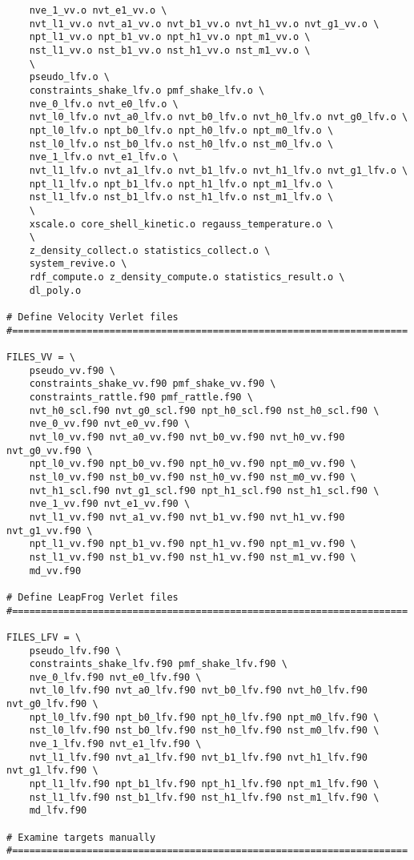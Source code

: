\begin{verbatim}
	nve_1_vv.o nvt_e1_vv.o \
	nvt_l1_vv.o nvt_a1_vv.o nvt_b1_vv.o nvt_h1_vv.o nvt_g1_vv.o \
	npt_l1_vv.o npt_b1_vv.o npt_h1_vv.o npt_m1_vv.o \
	nst_l1_vv.o nst_b1_vv.o nst_h1_vv.o nst_m1_vv.o \
	\
	pseudo_lfv.o \
	constraints_shake_lfv.o pmf_shake_lfv.o \
	nve_0_lfv.o nvt_e0_lfv.o \
	nvt_l0_lfv.o nvt_a0_lfv.o nvt_b0_lfv.o nvt_h0_lfv.o nvt_g0_lfv.o \
	npt_l0_lfv.o npt_b0_lfv.o npt_h0_lfv.o npt_m0_lfv.o \
	nst_l0_lfv.o nst_b0_lfv.o nst_h0_lfv.o nst_m0_lfv.o \
	nve_1_lfv.o nvt_e1_lfv.o \
	nvt_l1_lfv.o nvt_a1_lfv.o nvt_b1_lfv.o nvt_h1_lfv.o nvt_g1_lfv.o \
	npt_l1_lfv.o npt_b1_lfv.o npt_h1_lfv.o npt_m1_lfv.o \
	nst_l1_lfv.o nst_b1_lfv.o nst_h1_lfv.o nst_m1_lfv.o \
	\
	xscale.o core_shell_kinetic.o regauss_temperature.o \
	\
	z_density_collect.o statistics_collect.o \
	system_revive.o \
	rdf_compute.o z_density_compute.o statistics_result.o \
	dl_poly.o

# Define Velocity Verlet files
#=====================================================================

FILES_VV = \
	pseudo_vv.f90 \
	constraints_shake_vv.f90 pmf_shake_vv.f90 \
	constraints_rattle.f90 pmf_rattle.f90 \
	nvt_h0_scl.f90 nvt_g0_scl.f90 npt_h0_scl.f90 nst_h0_scl.f90 \
	nve_0_vv.f90 nvt_e0_vv.f90 \
	nvt_l0_vv.f90 nvt_a0_vv.f90 nvt_b0_vv.f90 nvt_h0_vv.f90 nvt_g0_vv.f90 \
	npt_l0_vv.f90 npt_b0_vv.f90 npt_h0_vv.f90 npt_m0_vv.f90 \
	nst_l0_vv.f90 nst_b0_vv.f90 nst_h0_vv.f90 nst_m0_vv.f90 \
	nvt_h1_scl.f90 nvt_g1_scl.f90 npt_h1_scl.f90 nst_h1_scl.f90 \
	nve_1_vv.f90 nvt_e1_vv.f90 \
	nvt_l1_vv.f90 nvt_a1_vv.f90 nvt_b1_vv.f90 nvt_h1_vv.f90 nvt_g1_vv.f90 \
	npt_l1_vv.f90 npt_b1_vv.f90 npt_h1_vv.f90 npt_m1_vv.f90 \
	nst_l1_vv.f90 nst_b1_vv.f90 nst_h1_vv.f90 nst_m1_vv.f90 \
	md_vv.f90

# Define LeapFrog Verlet files
#=====================================================================

FILES_LFV = \
	pseudo_lfv.f90 \
	constraints_shake_lfv.f90 pmf_shake_lfv.f90 \
	nve_0_lfv.f90 nvt_e0_lfv.f90 \
	nvt_l0_lfv.f90 nvt_a0_lfv.f90 nvt_b0_lfv.f90 nvt_h0_lfv.f90 nvt_g0_lfv.f90 \
	npt_l0_lfv.f90 npt_b0_lfv.f90 npt_h0_lfv.f90 npt_m0_lfv.f90 \
	nst_l0_lfv.f90 nst_b0_lfv.f90 nst_h0_lfv.f90 nst_m0_lfv.f90 \
	nve_1_lfv.f90 nvt_e1_lfv.f90 \
	nvt_l1_lfv.f90 nvt_a1_lfv.f90 nvt_b1_lfv.f90 nvt_h1_lfv.f90 nvt_g1_lfv.f90 \
	npt_l1_lfv.f90 npt_b1_lfv.f90 npt_h1_lfv.f90 npt_m1_lfv.f90 \
	nst_l1_lfv.f90 nst_b1_lfv.f90 nst_h1_lfv.f90 nst_m1_lfv.f90 \
	md_lfv.f90

# Examine targets manually
#=====================================================================


\end{verbatim}
